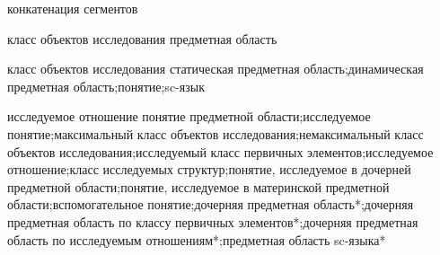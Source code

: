\begin{SCn}
\scnsectionheader{\currentname}
\begin{scnsubstruct}
\begin{scnreltovector}{конкатенация сегментов}
\end{scnreltovector}
\begin{scnhaselementrole}{класс объектов исследования}
предметная область\end{scnhaselementrole}
\begin{scnhaselementrolelist}{класс объектов исследования}
статическая предметная область;динамическая предметная область;понятие;sc-язык
\end{scnhaselementrolelist}
\begin{scnhaselementrolelist}{исследуемое отношение}
понятие предметной области\scnrolesign ;исследуемое понятие\scnrolesign ;максимальный класс объектов исследования\scnrolesign ;немаксимальный класс объектов исследования\scnrolesign ;исследуемый класс первичных элементов\scnrolesign ;исследуемое отношение\scnrolesign ;класс исследуемых структур\scnrolesign ;понятие, исследуемое в дочерней предметной области\scnrolesign ;понятие, исследуемое в материнской предметной области\scnrolesign ;вспомогательное понятие\scnrolesign ;дочерняя предметная область*;дочерняя предметная область по классу первичных элементов*;дочерняя предметная область по исследуемым отношениям*;предметная область sc-языка*
\end{scnhaselementrolelist}
\end{scnsubstruct}
\begin{scnsubstruct}

\end{scnsubstruct}
\end{SCn}
